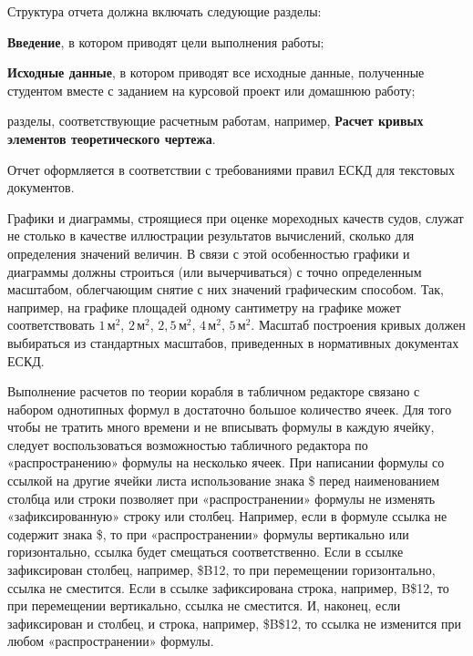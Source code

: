 Структура отчета должна включать следующие разделы:

\textbf{Введение}, в котором приводят цели выполнения работы;

\textbf{Исходные данные}, в котором приводят все исходные данные, полученные студентом вместе с заданием на курсовой проект или домашнюю работу;

разделы, соответствующие расчетным работам, например, \textbf{Расчет кривых элементов теоретического чертежа}.

Отчет оформляется в соответствии с требованиями правил ЕСКД для текстовых документов.

Графики и диаграммы, строящиеся при оценке мореходных качеств судов, служат не столько в качестве иллюстрации результатов вычислений, сколько для определения значений величин.
В связи с этой особенностью графики и диаграммы должны строиться (или вычерчиваться) с точно определенным масштабом, облегчающим снятие с них значений графическим способом.
Так, например, на графике площадей одному сантиметру на графике может соответствовать $1\,\text{м}^2$, $2\,\text{м}^2$, $2{,}5\,\text{м}^2$, $4\,\text{м}^2$, $5\,\text{м}^2$.
Масштаб построения кривых должен выбираться из стандартных масштабов, приведенных в нормативных документах ЕСКД.

Выполнение расчетов по теории корабля в табличном редакторе связано с набором однотипных формул в достаточно большое количество ячеек.
Для того чтобы не тратить много времени и не вписывать формулы в каждую ячейку, следует воспользоваться возможностью табличного редактора по «распространению» формулы на несколько ячеек.
При написании формулы со ссылкой на другие ячейки листа использование знака \$ перед наименованием столбца или строки позволяет при «распространении» формулы не изменять «зафиксированную» строку или столбец.
Например, если в формуле ссылка не содержит знака \$, то при «распространении» формулы вертикально или горизонтально, ссылка будет смещаться соответственно.
Если в ссылке зафиксирован столбец, например, \$B12, то при перемещении горизонтально, ссылка не сместится.
Если в ссылке зафиксирована строка, например, B\$12, то при перемещении вертикально, ссылка не сместится.
И, наконец, если зафиксирован и столбец, и строка, например, \$B\$12, то ссылка не изменится при любом «распространении» формулы.
